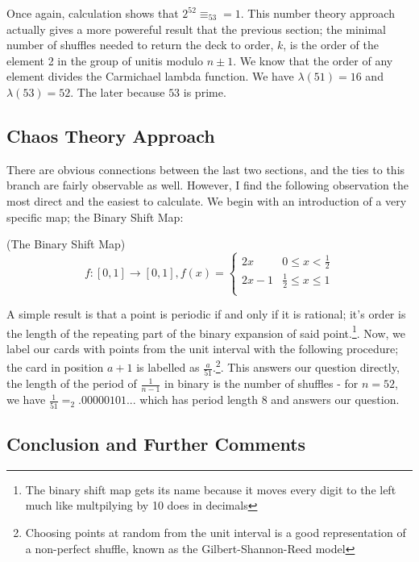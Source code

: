 \documentclass[../Axiomathic.tex]{subfiles}
\begin{document}
Once again, calculation shows that $2^52 \equiv_{53} =1$. This number theory approach actually gives a more powereful result that the previous section; the minimal number of shuffles needed to return the deck to order, $k$, is the order of the element 2 in the group of unitis modulo $n \pm 1$. We know that the order of any element divides the Carmichael lambda function. We have $\lambda(51)=16$ and $\lambda(53)=52$. The later because $53$ is prime.

\subsection{Chaos Theory Approach}
There are obvious connections between the last two sections, and the ties to this branch are fairly observable as well. However, I find the following observation the most direct and the easiest to calculate. We begin with an introduction of a very specific map; the Binary Shift Map: \begin{defn}(The Binary Shift Map)\label{Binary Shift Map}
\[f : [0,1] \rightarrow [0,1], f(x)=\begin{cases} 
     2x & 0 \leq x < \frac{1}{2}\\
2x-1 & \frac{1}{2} \leq x \leq 1\\
   \end{cases}
\] \end{defn}

A simple result is that a point is periodic if and only if it is rational; it's order is the length of the repeating part of the binary expansion of said point.\footnote{The binary shift map gets its name because it moves every digit to the left much like multpilying by 10 does in decimals}. Now, we label our cards with points from the unit interval with the following procedure; the card in position $a+1$ is labelled as $\frac{a}{51}$.\footnote{Choosing points at random from the unit interval is a good representation of a non-perfect shuffle, known as the Gilbert-Shannon-Reed model}. This answers our question directly, the length of the period of $\frac{1}{n-1}$ in binary is the number of shuffles - for $n=52$, we have $\frac{1}{51} =_{2} .00000101...$ which has period length 8 and answers our question. 

\subsection{Conclusion and Further Comments}
\end{document}
